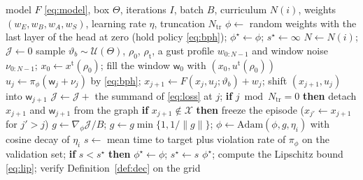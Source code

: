 \documentclass[final,5p,times,twocolumn]{elsarticle}
\begin{document}
\begin{algorithm}[t]\caption{Physics-informed training of HOT}\label{alg:train}\begin{algorithmic}[1]
\Require model $F$ \eqref{eq:model}, box $\Theta$, iterations $I$, batch $B$, curriculum $N(i)$, weights $(w_E,w_B,w_A,w_S)$, learning rate $\eta$, truncation $N_{\mathrm{tr}}$
\State $\phi\leftarrow$ random weights with the last layer of the head at zero (hold policy \eqref{eq:bph}); $\phi^\star\leftarrow\phi$; $s^\star\leftarrow\infty$
  \State $N\leftarrow N(i)$; $\mathcal J\leftarrow0$
    \State sample $\vartheta_b\sim\mathcal U(\Theta)$, $\rho_0$, $\rho_{\mathrm t}$, a gust profile $w_{0:N-1}$ and window noise $\nu_{0:N-1}$; $x_0\leftarrow x^{\mathrm t}(\rho_0)$; fill the window $\mathsf w_0$ with $(x_0,u^{\mathrm t}(\rho_0))$
      \State $u_j\leftarrow\pi_\phi(\mathsf w_j+\nu_j)$ by \eqref{eq:bph}; $x_{j+1}\leftarrow F(x_j,u_j;\vartheta_b)+w_j$; shift $(x_{j+1},u_j)$ into $\mathsf w_{j+1}$
      \State $\mathcal J\leftarrow\mathcal J+$ the summand of \eqref{eq:loss} at $j$; \textbf{if} $j\bmod N_{\mathrm{tr}}=0$ \textbf{then} detach $x_{j+1}$ and $\mathsf w_{j+1}$ from the graph
      \State \textbf{if} $x_{j+1}\notin\mathcal X$ \textbf{then} freeze the episode ($x_{j'}\leftarrow x_{j+1}$ for $j'>j$)
    \EndFor
  \EndFor
  \State $g\leftarrow\nabla_\phi\mathcal J/B$; $g\leftarrow g\min\{1,1/\|g\|\}$; $\phi\leftarrow\mathrm{Adam}(\phi,g,\eta_i)$ with cosine decay of $\eta_i$
    \State $s\leftarrow$ mean time to target plus violation rate of $\pi_\phi$ on the validation set; \textbf{if} $s<s^\star$ \textbf{then} $\phi^\star\leftarrow\phi$; $s^\star\leftarrow s$
  \EndIf
\EndFor
\State \Return $\phi^\star$; compute the Lipschitz bound \eqref{eq:lip}; verify Definition~\ref{def:dec} on the grid
\end{algorithmic}\end{algorithm}
\end{document}
